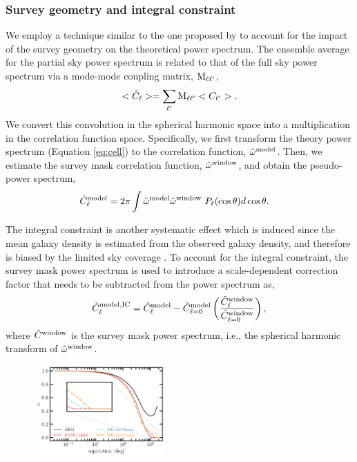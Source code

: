 \subsubsection{Survey geometry and integral constraint}
We employ a technique similar to the one proposed by \cite{chon2004fast} to account for the impact of the survey geometry on the theoretical power spectrum. The ensemble average for the partial sky power spectrum is related to that of the full sky power spectrum via a mode-mode coupling matrix, ${\rm M}_{\ell \ell^{\prime}}$,
\begin{equation}\label{eq:mixm}
    <\tilde{C}_{\ell}> = \sum_{\ell^{\prime}} {\rm M}_{\ell \ell^{\prime}}<C_{\ell^{\prime}}>.
\end{equation}
We convert this convolution in the spherical harmonic space into a multiplication in the correlation function space. Specifically, we first transform the theory power spectrum (Equation \ref{eq:cell}) to the correlation function, $\hat{\omega}^{\rm model}$. Then, we estimate the survey mask correlation function, $\hat{\omega}^{\rm window}$, and obtain the pseudo-power spectrum,
\begin{align}
    \tilde{C}^{\rm model}_{\ell} &= 2\pi \int \hat{\omega}^{\rm model}\hat{\omega}^{\rm window}~P_{\ell}(\cos\theta) d\cos\theta.
\end{align}

The integral constraint is another systematic effect which is induced since the mean galaxy density is estimated from the observed galaxy density, and therefore is biased by the limited sky coverage \citep{peacock1991large}. To account for the integral constraint, the survey mask power spectrum is used to introduce a scale-dependent correction factor that needs to be subtracted from the power spectrum as,
\begin{equation}
     \tilde{C}^{\rm model, IC}_{\ell} = \tilde{C}^{\rm model}_{\ell} - \tilde{C}^{\rm model}_{\ell=0} \left(\frac{\tilde{C}^{\rm window}_{\ell}}{\tilde{C}^{\rm window}_{\ell=0}}\right),
\end{equation}
where $\tilde{C}^{\rm window}$ is the survey mask power spectrum, i.e., the spherical harmonic transform of $\hat{\omega}^{\rm window}$.

\begin{figure}
    \centering
    \includegraphics[width=0.45\textwidth]{figures/mask_2pf.pdf}
    \caption{}
    \label{fig:mask2pf}
\end{figure}



